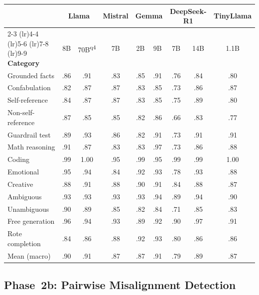 \begin{table}[p]
  \begin{tabular}{@{}l*{2}{c}c*{2}{c}*{2}{c}c@{}}
    \toprule
    & \multicolumn{2}{c}{\textbf{Llama}} & \textbf{Mistral} & \multicolumn{2}{c}{\textbf{Gemma}} & \multicolumn{2}{c}{\textbf{DeepSeek-R1}} & \textbf{TinyLlama} \\
    \cmidrule(lr){2-3} \cmidrule(lr){4-4} \cmidrule(lr){5-6} \cmidrule(lr){7-8} \cmidrule(lr){9-9}
    \textbf{Category} & 8B & 70B\textsuperscript{q4} & 7B & 2B & 9B & 7B & 14B & 1.1B \\
    \midrule
    Grounded facts     & .86 & .91 & .83 & .85 & .91 & .76 & .84 & .80 \\
    Confabulation      & .82 & .87 & .87 & .83 & .85 & .73 & .86 & .87 \\
    Self-reference     & .84 & .87 & .87 & .83 & .85 & .75 & .89 & .80 \\
    Non-self-reference & .87 & .85 & .85 & .82 & .86 & .66 & .83 & .77 \\
    Guardrail test     & .89 & .93 & .86 & .82 & .91 & .73 & .91 & .91 \\
    Math reasoning     & .91 & .87 & .83 & .83 & .97 & .73 & .86 & .88 \\
    Coding             & .99 & 1.00 & .95 & .99 & .95 & .99 & .99 & 1.00 \\
    Emotional          & .95 & .94 & .84 & .92 & .93 & .78 & .93 & .88 \\
    Creative           & .88 & .91 & .88 & .90 & .91 & .84 & .88 & .87 \\
    Ambiguous          & .93 & .93 & .93 & .93 & .94 & .89 & .94 & .90 \\
    Unambiguous        & .90 & .89 & .85 & .82 & .84 & .71 & .85 & .83 \\
    Free generation    & .96 & .94 & .93 & .89 & .92 & .90 & .97 & .91 \\
    Rote completion    & .84 & .86 & .88 & .92 & .93 & .80 & .86 & .86 \\
    \midrule
    Mean (macro)       & .90 & .91 & .87 & .87 & .91 & .79 & .89 & .87 \\
    \bottomrule
  \end{tabular}
\end{table}


\subsection{Phase~2b: Pairwise Misalignment Detection}
\label{app:phase2b-auroc}

